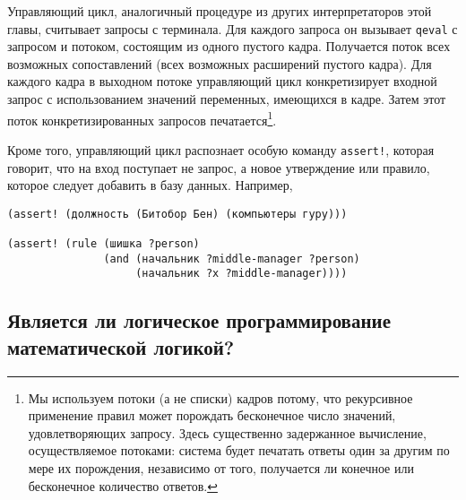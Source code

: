 Управляющий 
цикл, аналогичный процедуре   из других интерпретаторов 
этой главы, считывает запросы с терминала.  Для каждого запроса он вызывает
{\tt qeval} с запросом и потоком, состоящим из одного пустого
кадра.  Получается поток всех возможных сопоставлений (всех возможных
расширений пустого кадра).  Для каждого кадра в выходном потоке
управляющий цикл конкретизирует входной запрос с использованием
значений переменных, имеющихся в кадре.  Затем этот поток конкретизированных
запросов печатается\footnote{Мы используем потоки (а не списки) кадров потому, что
рекурсивное применение правил может порождать бесконечное число
значений, удовлетворяющих запросу.  Здесь существенно задержанное
вычисление, осуществляемое потоками: система будет печатать ответы
один за другим по мере их порождения, независимо от того, получается
ли конечное или бесконечное количество ответов.}.

Кроме того, управляющий цикл распознает особую команду
{\tt assert!}, которая говорит, что на вход поступает не
запрос, а  
 новое утверждение или правило, которое следует добавить в
базу данных.  Например,

\begin{Verbatim}[fontsize=\small]
(assert! (должность (Битобор Бен) (компьютеры гуру)))

(assert! (rule (шишка ?person)
               (and (начальник ?middle-manager ?person)
                    (начальник ?x ?middle-manager))))
\end{Verbatim}

\subsection{Является ли логическое программирование математической
логикой?}
\label{IS-LOGIC-PROGRAMMING-MATHEMATICAL-LOGIC}%


